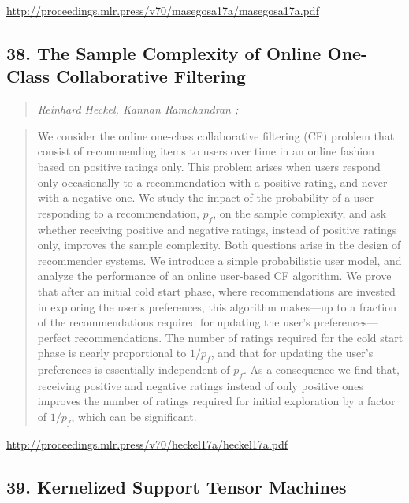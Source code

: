 \documentclass{article}
\begin{document}
\href{http://proceedings.mlr.press/v70/masegosa17a/masegosa17a.pdf}{http://proceedings.mlr.press/v70/masegosa17a/masegosa17a.pdf}

\subsection{38. The Sample Complexity of Online One-Class Collaborative Filtering}

\begin{quote}
\footnotesize{\textit{Reinhard Heckel, Kannan Ramchandran ;}}

\end{quote}

\begin{quote}
    We consider the online one-class collaborative filtering (CF) problem that consist of recommending items to users over time in an online fashion based on positive ratings only. This problem arises when users respond only occasionally to a recommendation with a positive rating, and never with a negative one. We study the impact of the probability of a user responding to a recommendation, $p_f$, on the sample complexity, and ask whether receiving positive and negative ratings, instead of positive ratings only, improves the sample complexity. Both questions arise in the design of recommender systems. We introduce a simple probabilistic user model, and analyze the performance of an online user-based CF algorithm. We prove that after an initial cold start phase, where recommendations are invested in exploring the user’s preferences, this algorithm makes—up to a fraction of the recommendations required for updating the user’s preferences—perfect recommendations. The number of ratings required for the cold start phase is nearly proportional to $1/p_f$, and that for updating the user’s preferences is essentially independent of $p_f$. As a consequence we find that, receiving positive and negative ratings instead of only positive ones improves the number of ratings required for initial exploration by a factor of $1/p_f$, which can be significant.  
\end{quote}

\href{http://proceedings.mlr.press/v70/heckel17a/heckel17a.pdf}{http://proceedings.mlr.press/v70/heckel17a/heckel17a.pdf}

\subsection{39. Kernelized Support Tensor Machines}
\end{document}

